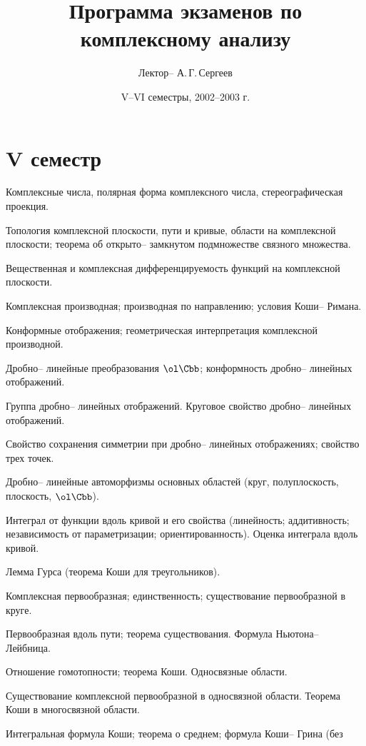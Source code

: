 \documentclass[a4paper]{article}
\title{Программа экзаменов по комплексному анализу}
\author{Лектор-- А.\,Г.\,Сергеев}
\date{V--VI семестры, 2002--2003 г.}
\begin{document}
\maketitle

\section*{V семестр}

\begin{nums}{-3}
\item Комплексные числа, полярная форма комплексного числа, стереографическая проекция.
\item Топология комплексной плоскости, пути и кривые, области на комплексной
плоскости; теорема об открыто-- замкнутом подмножестве связного множества.
\item Вещественная и комплексная дифференцируемость функций на комплексной
плоскости.
\item Комплексная производная; производная по направлению; условия Коши-- Римана.
\item Конформные отображения; геометрическая интерпретация комплексной
производной.
\item Дробно-- линейные преобразования $\ol\Cbb$; конформность дробно-- линейных отображений.
\item Группа дробно-- линейных отображений. Круговое свойство дробно-- линейных
отображений.
\item Свойство сохранения симметрии при дробно-- линейных отображениях; свойство
трех точек.
\item Дробно-- линейные автоморфизмы основных областей (круг, полуплоскость,
плоскость, $\ol\Cbb$).
\item Интеграл от функции вдоль кривой и его свойства (линейность;
аддитивность; независимость от параметризации; ориентированность). Оценка
интеграла вдоль кривой.
\item Лемма Гурса (теорема Коши для треугольников).
\item Комплексная первообразная; единственность; существование первообразной в
круге.
\item Первообразная вдоль пути; теорема существования. Формула
Ньютона-- Лейбница.
\item Отношение гомотопности; теорема Коши. Односвязные области.
\item Существование комплексной первообразной в односвязной области. Теорема
Коши в многосвязной области.
\item Интегральная формула Коши; теорема о среднем; формула Коши-- Грина (без

\end{nums}
\end{document}
